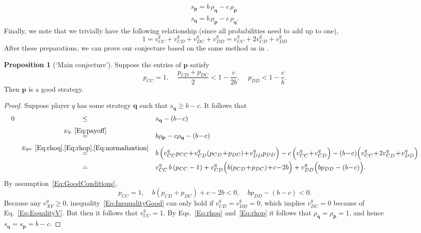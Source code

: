 \documentclass{article}
\theoremstyle{definition}
\newtheorem{Prop}{Proposition}
\begin{document}
\begin{equation} \label{Eq:payoff}
\begin{array}{lll}
s_\mathbf{p} =  b\, \rho_\mathbf{q} - c\, \rho_\mathbf{p}\\
s_\mathbf{q} = b\, \rho_\mathbf{p} - c\, \rho_\mathbf{q}.
\end{array}
\end{equation}
Finally, we note that we trivially have the following relationship (since all probabilities need to add up to one), 
\begin{equation} \label{Eq:normalization}
1 = v^q_{CC} +  v^q_{CD} + v^q_{DC} + v^q_{DD} = v^q_{CC} +  2v^q_{CD} + v^q_{DD}
\end{equation}
After these preparations, we can prove our conjecture based on the same method as in \citet{akin:EGADS:2016}.
 
 \begin{Prop}[`Main conjecture']
 Suppose the entries of $\mathbf{p}$ satisfy 
 \begin{equation} \label{Eq:GoodConditions}
 p_{CC}\!=\!1,~~~~~\frac{p_{CD}+p_{DC}}{2} \!<\! 1\!-\!\frac{c}{2b},~~~~~p_{DD}<1\!-\!\frac{c}{b}.
 \end{equation} 
 Then $\mathbf{p}$ is a good strategy. 
 \end{Prop}
\begin{proof}
Suppose player $q$ has some strategy $\mathbf{q}$ such that $s_\mathbf{q} \ge b\!-\!c$. It follows that
\begin{equation} \label{Eq:InequalityGood}
\begin{array}{rcl}
0 	&\le	&s_\mathbf{q}-(b\!-\!c)\\[0.2cm]
	&\stackrel{Eq.~\eqref{Eq:payoff}}{=}	&b\rho_\mathbf{p} - c\rho_\mathbf{q}-(b\!-\!c)\\[0.2cm]
	&\stackrel{Eqs.~\eqref{Eq:rhoq}, \eqref{Eq:rhop}, \eqref{Eq:normalization}}{=}	&b\,\Big( v^q_{CC} p_{CC} \!+\!  v^q_{CD}(p_{CD}\!+\!p_{DC}) \!+\! v^q_{DD} p_{DD}\Big) 
		- c\,\Big(v^q_{CC} \!+\! v^q_{CD}\Big) - (b\!-\!c)\Big(v^q_{CC} \!+\!  2v^q_{CD} \!+\! v^q_{DD}\Big)\\[0.2cm]
	&=	&v^q_{CC} \,b\,(p_{CC}-1) + v^q_{CD}\Big(b(p_{CD}\!+\!p_{DC})\!+\!c\!-\!2b\Big) + v^q_{DD}\Big(bp_{DD}-(b\!-\!c)\Big).
\end{array}
\end{equation}
By assumption~\eqref{Eq:GoodConditions},
\begin{equation}
p_{CC}=1,~~~~~b(p_{CD}\!+\!p_{DC})\!+\!c\!-\!2b<0,~~~~~bp_{DD}-(b\!-\!c)<0.
\end{equation}
Because any $v^q_{XY}\!\ge\!0$, inequality~\eqref{Eq:InequalityGood} can only hold if $v^q_{CD}\!=\!v^q_{DD}\!=\!0$, which implies $v^q_{DC}\!=\!0$ because of Eq.~\eqref{Eq:EqualityV}. But then it follows that $v^q_{CC}\!=\!1$. By Eqs.~\eqref{Eq:rhoq} and~\eqref{Eq:rhop} it follows that $\rho_\mathbf{q}\!=\!\rho_\mathbf{p}\!=\!1$, and hence $s_\mathbf{q}\!=\!s_\mathbf{p}\!=\!b\!-\!c$. 
\end{proof}
\end{document}
